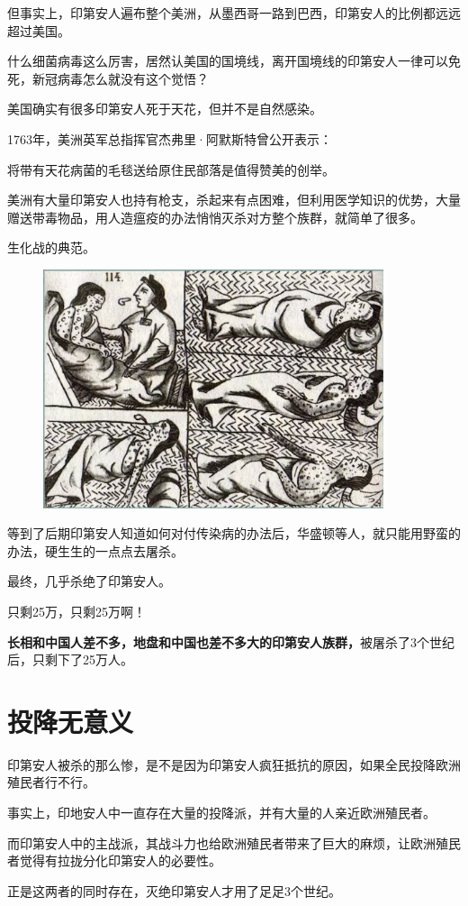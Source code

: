 \documentclass[UTF8, 11pt, oneside]{ctexart}
\newcommand{\zd}[1]{\textbf{\textcolor[RGB]{123,12,0}{#1}}} %
\newcommand{\yh}[1]{%
    \begin{tcolorbox}[enhanced,
        frame hidden, interior hidden,
        before skip = 5mm, left skip=10mm,
        borderline west={5pt}{0pt}{gray!50}]
        #1
    \end{tcolorbox}
}
\newcommand{\biaoti}[1]{%
    \section*{#1}
}
\begin{document}
但事实上，印第安人遍布整个美洲，从墨西哥一路到巴西，印第安人的比例都远远超过美国。

什么细菌病毒这么厉害，居然认美国的国境线，离开国境线的印第安人一律可以免死，新冠病毒怎么就没有这个觉悟？

美国确实有很多印第安人死于天花，但并不是自然感染。

1763年，美洲英军总指挥官杰弗里·阿默斯特曾公开表示：

\yh{
    将带有天花病菌的毛毯送给原住民部落是值得赞美的创举。
}

美洲有大量印第安人也持有枪支，杀起来有点困难，但利用医学知识的优势，大量赠送带毒物品，用人造瘟疫的办法悄悄灭杀对方整个族群，就简单了很多。

生化战的典范。

\begin{figure}[H]
    \centering
    \includegraphics[width=10cm]{2023-10-13-009}
\end{figure}

等到了后期印第安人知道如何对付传染病的办法后，华盛顿等人，就只能用野蛮的办法，硬生生的一点点去屠杀。

最终，几乎杀绝了印第安人。

只剩25万，只剩25万啊！

\zd{长相和中国人差不多，地盘和中国也差不多大的印第安人族群，}被屠杀了3个世纪后，只剩下了25万人。


\biaoti{投降无意义 }

印第安人被杀的那么惨，是不是因为印第安人疯狂抵抗的原因，如果全民投降欧洲殖民者行不行。

事实上，印地安人中一直存在大量的投降派，并有大量的人亲近欧洲殖民者。

而印第安人中的主战派，其战斗力也给欧洲殖民者带来了巨大的麻烦，让欧洲殖民者觉得有拉拢分化印第安人的必要性。

正是这两者的同时存在，灭绝印第安人才用了足足3个世纪。
\end{document}
